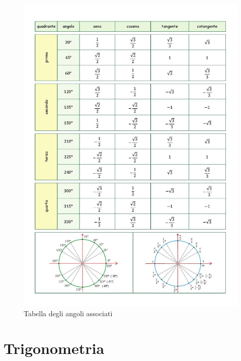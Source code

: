 \documentclass[a4paper]{article}
\begin{document}
	\begin{center}
		\begin{figure}
			\includegraphics[width=\linewidth]{sincos.jpg}
			\caption{Tabella degli angoli associati}
		\end{figure}
	\end{center}
	
	
	\newpage
	\section{Trigonometria}
\end{document}
